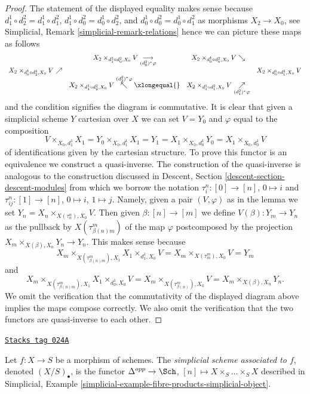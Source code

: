 \begin{proof}
The statement of the displayed equality makes sense because
$d^1_1 \circ d^2_2 = d^1_1 \circ d^2_1$,
$d^1_1 \circ d^2_0 = d^1_0 \circ d^2_2$, and
$d^1_0 \circ d^2_0 = d^1_0 \circ d^2_1$ as morphisms $X_2 \to X_0$, see
Simplicial, Remark \ref{simplicial-remark-relations} hence we
can picture these maps as follows
$$
\begin{array}{cccc} & X_2 \times_{d^1_1 \circ d^2_0, X_0} V
\underset{(d^2_0)^*\varphi}{\longrightarrow} & X_2 \times_{d^1_0 \circ d^2_0, X_0} V
\searrow &  \\ X_2 \times_{d^1_0 \circ d^2_2, X_0} V
\nearrow &  &  & X_2 \times_{d^1_0 \circ d^2_1, X_0} V \\  & X_2 \times_{d^1_1 \circ d^2_2, X_0} V
\overset{(d^2_2)^*\varphi}{\nwarrow}\xlongequal{} & X_2 \times_{d^1_1 \circ d^2_1, X_0} V
\underset{(d^2_1)^*\varphi}{\nearrow} & \end{array}
$$
and the condition signifies the diagram is commutative. It is clear that
given a simplicial scheme $Y$ cartesian over $X$ we can
set $V = Y_0$ and $\varphi$ equal to the composition
$$
V \times_{X_0, d^1_1} X_1 =
Y_0 \times_{X_0, d^1_1} X_1 = Y_1 =
X_1 \times_{X_0, d^1_0} Y_0 =
X_1 \times_{X_0, d^1_0} V
$$
of identifications given by the cartesian structure. To prove this functor
is an equivalence we construct a quasi-inverse. The construction of
the quasi-inverse is analogous to the construction discussed in
Descent, Section \ref{descent-section-descent-modules} from which we borrow
the notation $\tau^n_i : [0] \to [n]$, $0 \mapsto i$ and
$\tau^n_{ij} : [1] \to [n]$, $0 \mapsto i$, $1 \mapsto j$.
Namely, given a pair $(V, \varphi)$
as in the lemma we set $Y_n = X_n \times_{X(\tau^n_n), X_0} V$.
Then given $\beta : [n] \to [m]$ we define
$V(\beta) : Y_m \to Y_n$ as the pullback by $X(\tau^m_{\beta(n)m})$
of the map $\varphi$ postcomposed by the projection
$X_m \times_{X(\beta), X_n} Y_n \to Y_n$. This makes sense because
$$
X_m \times_{X(\tau^m_{\beta(n)m}), X_1} X_1 \times_{d^1_1, X_0} V
=
X_m \times_{X(\tau^m_m), X_0} V = Y_m
$$
and
$$
X_m \times_{X(\tau^m_{\beta(n)m}), X_1} X_1 \times_{d^1_0, X_0} V =
X_m \times_{X(\tau^m_{\beta(n)}), X_0} V =
X_m \times_{X(\beta), X_n} Y_n.
$$
We omit the verification that the commutativity
of the displayed diagram
above implies the maps compose correctly. We also omit the verification
that the two functors are quasi-inverse to each other.
\end{proof}

\begin{definition}
\label{spaces-simplicial-definition-fibre-products-simplicial-scheme}
\href{https://stacks.math.columbia.edu/tag/024A}{\texttt{Stacks tag 024A}}

Let $f : X \to S$ be a morphism of schemes. The {\it simplicial scheme
associated to $f$}, denoted $(X/S)_\bullet$, is the functor
$\Delta^{opp} \to \Sch$, $[n] \mapsto X \times_S \ldots \times_S X$
described in
Simplicial, Example \ref{simplicial-example-fibre-products-simplicial-object}.
\end{definition}

